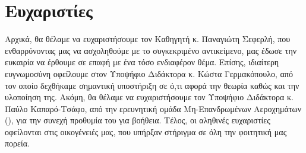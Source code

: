 
\cleardoublepage


\chapter*{Ευχαριστίες}

Αρχικά, θα θέλαμε να ευχαριστήσουμε τον Καθηγητή κ. Παναγιώτη Σεφερλή, που 
ενθαρρύνοντας μας να ασχοληθούμε με το συγκεκριμένο αντικείμενο, μας έδωσε την 
ευκαιρία να έρθουμε σε επαφή με ένα τόσο ενδιαφέρον θέμα. Επίσης, ιδιαίτερη 
ευγνωμοσύνη οφείλουμε στον Υποψήφιο Διδάκτορα κ. Κώστα Γερμακόπουλο, από τον 
οποίο δεχθήκαμε σημαντική υποστήριξη σε ό,τι αφορά την θεωρία καθώς και την 
υλοποίηση της. Ακόμη, θα θέλαμε να ευχαριστήσουμε τον Υποψήφιο Διδάκτορα κ. 
Παύλο Καπαρό-Τσάφο, από την ερευνητική ομάδα Μη-Επανδρωμένων Αεροχημάτων 
(), για την συνεχή προθυμία του για βοήθεια. Τέλος, οι αληθινές 
ευχαριστίες οφείλονται στις οικογένειές μας, που υπήρξαν στήριγμα σε όλη την 
φοιτητική μας πορεία. 
